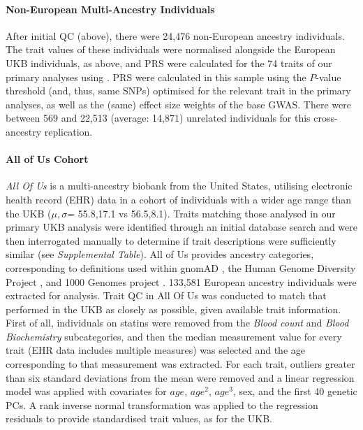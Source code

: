 \documentclass[12pt]{zHenriquesLab-StyleBioRxiv}
\begin{document}
\paragraph*{Non-European Multi-Ancestry Individuals}
After initial QC (above), there were 24,476 non-European ancestry individuals. The trait values of 
these individuals were normalised alongside the European UKB individuals, as above, and PRS 
were calculated for the 74 traits of our primary analyses using \cite{prsice}. 
PRS were calculated in this sample using the $P$-value threshold (and, thus, same SNPs) 
optimised for the relevant trait in the primary analyses, as well as the (same) effect 
size weights of the base GWAS. There were between 569 and 22,513 (average: 14,871) unrelated 
individuals for this cross-ancestry replication. 
%
\paragraph*{All of Us Cohort}
\emph{All Of Us} is a multi-ancestry biobank from the United States, utilising 
electronic health record (EHR) data in a cohort of individuals with a wider age 
range than the UKB ($\mu,\sigma$= 55.8,17.1 vs 56.5,8.1). 
Traits matching those analysed in our primary UKB analysis 
were identified through an initial database search and were 
then interrogated manually to determine if trait descriptions 
were sufficiently similar (see \textit{Supplemental Table}).  
All of Us provides ancestry categories, corresponding to definitions 
used within gnomAD \cite{gnomad}, 
the Human Genome Diversity Project \cite{hgdp}, 
and 1000 Genomes project \cite{tgp}.  
133,581  European ancestry individuals were extracted for analysis. %
Trait QC in All Of Us was conducted to match that performed in the UKB as closely as possible, given 
available trait information. First of all, individuals on statins were removed 
from the \textit{Blood count} and \textit{Blood Biochemistry} subcategories, and then the median measurement value for every trait (EHR data includes multiple measures) was selected and 
the age corresponding to that measurement was extracted. For each trait, outliers greater 
than six standard deviations from the mean were removed and a linear regression model was 
applied with covariates for $age$, $age^2$, $age^3$, sex, and the first 40 genetic PCs. A rank inverse normal transformation was applied to the regression residuals to provide standardised trait values, as for the UKB.
\end{document}
